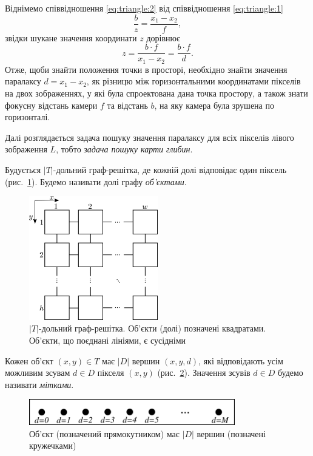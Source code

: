 Віднімемо співвідношення \eqref{eq:triangle:2} від співвідношення
\eqref{eq:triangle:1}
\begin{equation*}
    \frac{b}{z} = \frac{x_1 - x_2}{f},
\end{equation*}
звідки шукане значення координати $z$ дорівнює
\begin{equation*}
    z = \frac{b \cdot f}{x_1 - x_2} = \frac{b \cdot f}{d}.
\end{equation*}
Отже, щоби знайти положення точки в просторі,
необхідно знайти значення паралаксу $d = x_1 - x_2$,
як різницю між горизонтальними координатами пікселів
на двох зображеннях, у які була спроектована дана точка простору,
а також знати фокусну відстань камери $f$ та відстань  $b$,
на яку камера була зрушена по горизонталі.

Далі розглядається задача пошуку значення паралаксу для всіх пікселів
лівого зображення $L$, тобто \textit{задача пошуку карти глибин}.

Будується $\left| T \right|$-дольний граф-решітка,
де кожній долі відповідає один піксель (рис.~\ref{fig:grid:graph:pixels}).
Будемо називати долі графу \textit{об'єктами}.

\begin{figure}[h]
  \centering
  \includegraphics[width=0.5\textwidth]{images/grid_graph_pixels}
  \caption{$\left|T \right|$-дольний граф-решітка.
           Об'єкти (долі) позначені квадратами.
           Об'єкти, що поєднані лініями, є сусідніми}
  \label{fig:grid:graph:pixels}
\end{figure}


Кожен об'єкт $\left(x, y \right) \in T$ має $\left| D \right| $ вершин
$ \left( x, y, d \right)$,
які відповідають усім можливим зсувам $d \in D$ пікселя $\left(x, y \right)$
(рис.~\ref{fig:object:vertices}).
Значення зсувів $d \in D$ будемо називати \textit{мітками}.

\begin{figure}[h]
  \centering
  \includegraphics[width=0.8\textwidth]{images/object_with_vertices}
  \caption{Об'єкт (позначений прямокутником) має $\left| D \right|$ вершин
           (позначені кружечками)}
  \label{fig:object:vertices}
\end{figure}

